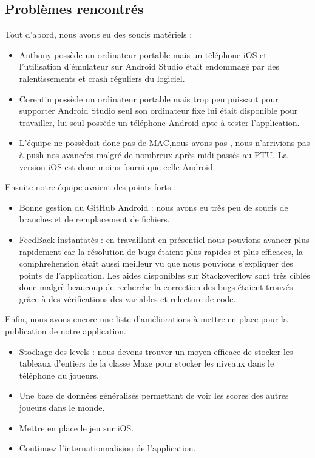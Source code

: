 \documentclass{article}
\begin{document}
\subsection{Problèmes rencontrés}
Tout d'abord, nous avons eu des soucis matériels :
\begin{itemize}
    \item Anthony possède un ordinateur portable mais un téléphone iOS et l'utilisation d'émulateur sur Android Studio était endommagé par des ralentissements et crash réguliers du logiciel.
    \item Corentin possède un ordinateur portable mais trop peu puissant pour supporter Android Studio seul son ordinateur fixe lui était disponible pour travailler, lui seul possède un téléphone Android apte à tester l'application.
    \item L'équipe ne possèdait donc pas de MAC,nous avons pas , nous n'arrivions pas à push nos avancées malgré de nombreux après-midi passés au PTU. La version iOS est donc moins fourni que celle Android.
\end{itemize}
Ensuite notre équipe avaient des points forts :
\begin{itemize}
    \item Bonne gestion du GitHub Android : nous avons eu très peu de soucis de branches et de remplacement de fichiers.
    \item FeedBack instantatés : en travaillant en présentiel nous pouvions avancer plus rapidement car la résolution de bugs étaient plus rapides et plus efficaces, la comphrehension était aussi meilleur vu que nous pouvions s'expliquer des points de l'application. Les aides disponibles sur Stackoverflow sont très ciblés donc malgrè beaucoup de recherche la correction des bugs étaient trouvés grâce à des vérifications des variables et relecture de code.
\end{itemize}
Enfin, nous avons encore une liste d'améliorations à mettre en place pour la publication de notre application.
\begin{itemize}
    \item Stockage des levels : nous devons trouver un moyen efficace de stocker les tableaux d'entiers de la classe Maze pour stocker les niveaux dans le téléphone du joueurs.
    \item Une base de données généralisés permettant de voir les scores des autres joueurs dans le monde.
    \item Mettre en place le jeu sur iOS.
    \item Continuez l'internationnalision de l'application.

\end{itemize}
\end{document}
